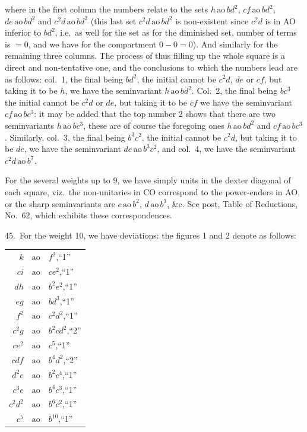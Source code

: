 \documentclass[11pt]{article}
\begin{document}
where in the first column the numbers relate to the sets $h\,\mathrm{ao}\,bd^2$, $cf\,\mathrm{ao}\,bd^2$, $de\,\mathrm{ao}\,bd^2$ and $c^2 d\,\mathrm{ao}\,bd^2$ (this last set $c^2 d\,\mathrm{ao}\,bd^2$ is non-existent since $c^2 d$ is in AO inferior to $bd^2$, i.e.\ as well for the set as for the diminished set, number of terms is $= 0$, and we have for the compartment $0 - 0 = 0$). And similarly for the remaining three columns. The process of thus filling up the whole square is a direct and non-tentative one, and the conclusions to which the numbers lead are as follows: col.\ 1, the final being $bd^2$, the initial cannot be $c^2 d$, $de$ or $cf$, but taking it to be $h$, we have the seminvariant $h\,\mathrm{ao}\,bd^2$. Col.\ 2, the final being $bc^3$ the initial cannot be $c^2 d$ or $de$, but taking it to be $cf$ we have the seminvariant $cf\,\mathrm{ao}\,bc^3$: it may be added that the top number 2 shows that there are two seminvariants $h\,\mathrm{ao}\,bc^3$, these are of course the foregoing ones $h\,\mathrm{ao}\,bd^2$ and $cf\,\mathrm{ao}\,bc^3$. Similarly, col.\ 3, the final being $b^3 c^2$, the initial cannot be $c^2 d$, but taking it to be $de$, we have the seminvariant $de\,\mathrm{ao}\,b^3 c^2$, and col.\ 4, we have the seminvariant $c^2 d\,\mathrm{ao}\,b^7$.

For the several weights up to 9, we have simply units in the dexter diagonal of each square, viz.\ the non-unitaries in CO correspond to the power-enders in AO, or the sharp seminvariants are $c\,\mathrm{ao}\,b^2$, $d\,\mathrm{ao}\,b^3$, \&c. See post, Table of Reductions, No.\ 62, which exhibits these correspondences.

45.\ For the weight 10, we have deviations: the figures 1 and 2 denote as follows:

\begin{center}
\begin{tabular}{rcl}
$k$ & $\mathrm{ao}$ & $f^2$,\quad ``1'' \\
$ci$ & $\mathrm{ao}$ & $ce^2$,\quad ``1'' \\
$dh$ & $\mathrm{ao}$ & $b^2 e^2$,\quad ``1'' \\
$eg$ & $\mathrm{ao}$ & $bd^3$,\quad ``1'' \\
$f^2$ & $\mathrm{ao}$ & $c^2 d^2$,\quad ``1'' \\
$c^2 g$ & $\mathrm{ao}$ & $b^2 c d^2$,\quad ``2'' \\
$ce^2$ & $\mathrm{ao}$ & $c^5$,\quad ``1'' \\
$cdf$ & $\mathrm{ao}$ & $b^4 d^2$,\quad ``2'' \\
$d^2 e$ & $\mathrm{ao}$ & $b^2 c^4$,\quad ``1'' \\
$c^3 e$ & $\mathrm{ao}$ & $b^4 c^3$,\quad ``1'' \\
$c^2 d^2$ & $\mathrm{ao}$ & $b^6 c^2$,\quad ``1'' \\
$c^5$ & $\mathrm{ao}$ & $b^{10}$,\quad ``1'' \\
\end{tabular}
\end{center}
\end{document}

